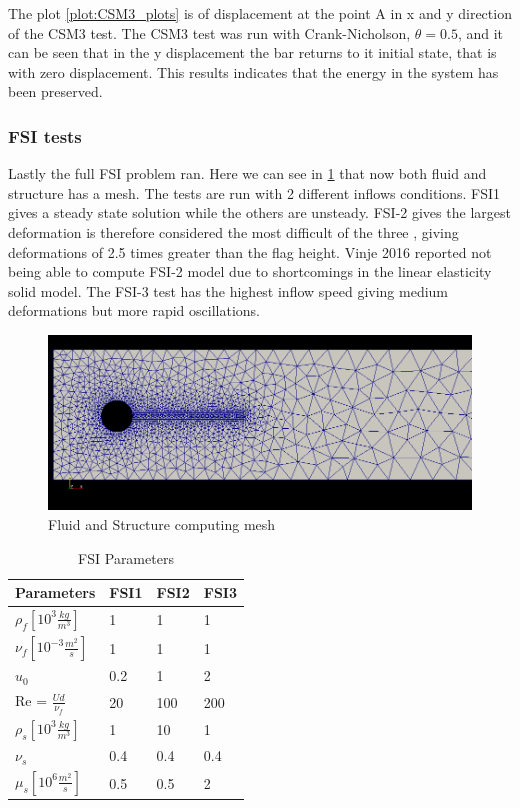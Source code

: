 The plot \ref{plot:CSM3_plots} is of displacement at the point A in x and y direction of the CSM3 test. The CSM3 test was run with Crank-Nicholson, $\theta = 0.5$, and it can be seen that in the y displacement the bar returns to it initial state, that is with zero displacement. This results indicates that the energy in the system has been preserved.

\subsubsection*{FSI tests}
Lastly the full FSI problem ran. Here we can see in \ref{fig:fluid_structure} that now both fluid and structure has a mesh. The tests are run with 2 different inflows conditions. FSI1 gives a steady state solution while the others are unsteady. FSI-2 gives the largest deformation is therefore considered the most difficult of the three \cite{Richter2013}, giving deformations of 2.5 times greater than the flag height. Vinje 2016 \cite{Vinje2016} reported not being able to compute FSI-2 model due to shortcomings in the linear elasticity solid model. The FSI-3 test has the highest inflow speed giving medium deformations but more rapid oscillations.

\begin{figure}[H]
\label{fig:fluid_structure}
\caption{Fluid and Structure computing mesh}
\includegraphics[scale=0.45, trim={4mm 21mm 2mm 10mm},clip]{./Verification_Validation/Hron_Turek/fluid_structure.png}
\end{figure}

\begin{table}[h!]
\centering
\caption{FSI Parameters}
\label{my-label}
\begin{tabular}{|l|l|l|l|}
\hline
Parameters & FSI1 & FSI2 & FSI3 \\ \hline
$\rho_f[10^3 \frac{kg}{m^3}]$ & 1 & 1 & 1 \\ \hline
$\nu_f [10^{-3} \frac{m^2}{s}]$ & 1 & 1 & 1 \\ \hline
$u_0$ & 0.2 & 1 & 2 \\ \hline
Re = $\frac{U d}{\nu_f}$ & 20 & 100 & 200 \\ \hline
$\rho_s[10^3 \frac{kg}{m^3}]$ & 1 & 10 & 1 \\ \hline
$\nu_s$ & 0.4 & 0.4 & 0.4 \\ \hline
$\mu_s[10^6 \frac{m^2}{s}]$ & 0.5 & 0.5 & 2 \\ \hline
\end{tabular}
\end{table}

